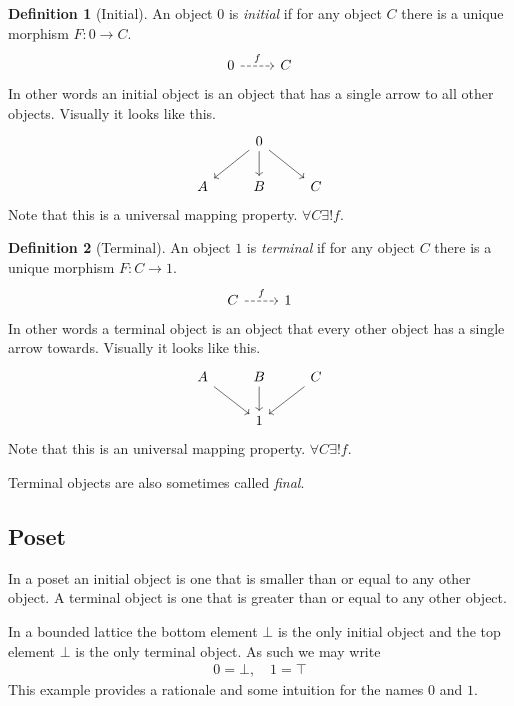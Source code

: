 \documentclass{book}
\theoremstyle{definition}
\newtheorem{definition}{Definition}[section]
\newcommand{\arr}[3]{#1 : #2 \rightarrow #3}
\begin{document}
\begin{definition}[Initial]
  An object $0$ is \emph{initial} if for any object $C$ there is a unique
  morphism $\arr{F}{0}{C}$.
  \[
    \begin{tikzcd}
      0 \arrow[r, dashrightarrow, "f"] & C
    \end{tikzcd}
  \]
  In other words an initial object is an object that has a single arrow to all
  other objects. Visually it looks like this.
  \[
    \begin{tikzcd}
      & 0 \arrow[ld] \arrow[d] \arrow[rd] \\
      A & B & C
    \end{tikzcd}
  \]
  Note that this is a universal mapping property. $\forall C \exists! f$.
\end{definition}

\begin{definition}[Terminal]
  An object $1$ is \emph{terminal} if for any object $C$ there is a unique
  morphism $F : C \to 1$.
  \[
    \begin{tikzcd}
      C \arrow[r, dashrightarrow, "f"] & 1
    \end{tikzcd}
  \]
  In other words a terminal object is an object that every other object has a
  single arrow towards. Visually it looks like this.
  \[
    \begin{tikzcd}
      A \arrow[rd] & B \arrow[d] & C \arrow[ld] \\
      & 1
    \end{tikzcd}
  \]
  Note that this is an universal mapping property. $\forall C \exists! f$.
\end{definition}

Terminal objects are also sometimes called \emph{final}.

\subsection{Poset}

In a poset an initial object is one that is smaller than or equal to any other
object. A terminal object is one that is greater than or equal to any other
object.

In a bounded lattice the bottom element $\bot$ is the only initial object and the
top element $\bot$ is the only terminal object. As such we may write
\begin{align*}
  0 = \bot, \quad 1 = \top
\end{align*}
This example provides a rationale and some intuition for the names $0$ and $1$.
\end{document}

